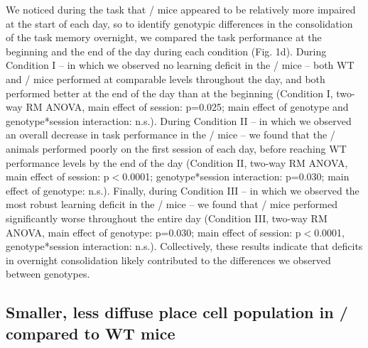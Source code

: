We noticed during the task that \df/ mice appeared to be relatively more impaired at the start of each day, so to identify genotypic differences in the consolidation of the task memory overnight, we compared the task performance at the beginning and the end of the day during each condition (Fig. 1d). During Condition I – in which we observed no learning deficit in the \df/ mice – both WT and \df/ mice performed at comparable levels throughout the day, and both performed better at the end of the day than at the beginning (Condition I, two-way RM ANOVA, main effect of session: p=0.025; main effect of genotype and genotype*session interaction: n.s.). During Condition II – in which we observed an overall decrease in task performance in the \df/ mice –  we found that the \df/ animals performed poorly on the first session of each day, before reaching WT performance levels by the end of the day (Condition II, two-way RM ANOVA, main effect of session: p$<$0.0001; genotype*session interaction: p=0.030; main effect of genotype: n.s.). Finally, during Condition III – in which we observed the most robust learning deficit in the \df/ mice – we found that \df/ mice performed significantly worse throughout the entire day (Condition III, two-way RM ANOVA, main effect of genotype: p=0.030; main effect of session: p$<$0.0001, genotype*session interaction: n.s.). Collectively, these results indicate that deficits in overnight consolidation likely contributed to the differences we observed between genotypes.

\subsection{Smaller, less diffuse place cell population in \df/ compared to WT mice}

